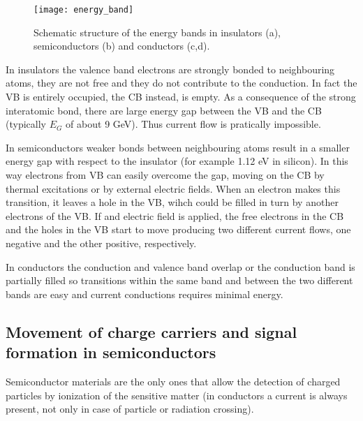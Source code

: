 \begin{figure}[h!]
\centering
\texttt{[image: energy\_band]}
\caption{Schematic structure of the energy bands in insulators (a), semiconductors (b) and conductors (c,d).}
\label{fig:energy_band}
\end{figure}

In insulators the valence band electrons are strongly bonded to neighbouring atoms, they are not free and they do not contribute to the conduction. In fact the VB is entirely occupied, the CB instead, is empty. As a consequence of the strong interatomic bond, there are large energy gap between the VB and the CB (typically $E_{G}$ of about 9 GeV). Thus current flow is pratically impossible. 

In semiconductors weaker bonds between neighbouring atoms result in a smaller energy gap with respect to the insulator (for example 1.12 eV in silicon). In this way electrons from VB can easily overcome the gap, moving on the CB by thermal excitations or by external electric fields. When an electron makes this transition, it leaves a hole in the VB, wihch could be filled in turn by another electrons of the VB. If and electric field is applied, the free electrons in the CB and the holes in the VB start to move producing two different current flows, one negative and the other positive, respectively.

In conductors the conduction and valence band overlap or the conduction band is partially filled so transitions within the same band and between the two different bands are easy and current conductions requires minimal energy.


\subsection{Movement of charge carriers and signal formation in semiconductors}

Semiconductor materials are the only ones that allow the detection of charged particles by ionization of the sensitive matter (in conductors a current is always present, not only in case of particle or radiation crossing). 

